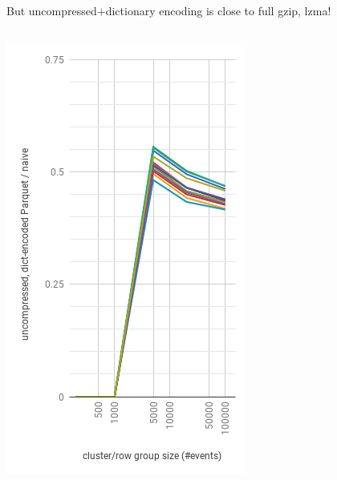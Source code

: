 \documentclass[aspectratio=169]{beamer}
\begin{document}
\begin{frame}{But uncompressed$+$dictionary encoding is close to full gzip, lzma!}
\begin{columns}
\begin{center}
\includegraphics[width=\linewidth]{parquet-dict.png}
\end{center}
\end{columns}
\end{frame}
\end{document}
